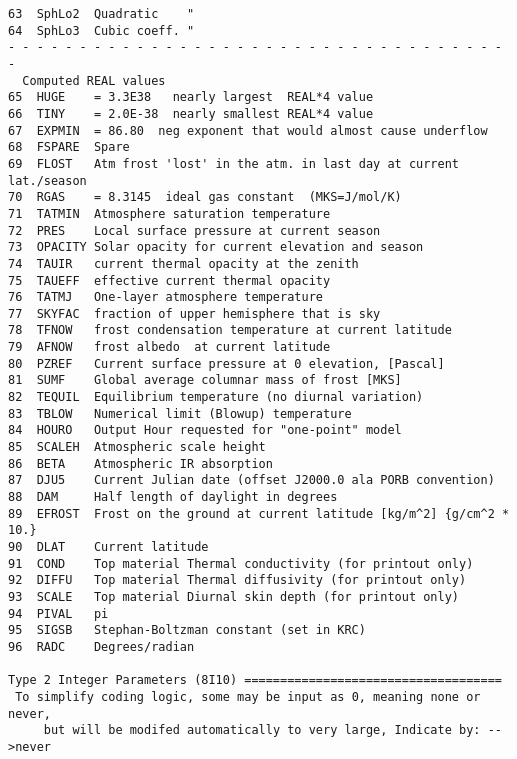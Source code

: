 \documentclass{article}
\begin{document}
\begin{verbatim}
63  SphLo2  Quadratic    "
64  SphLo3  Cubic coeff. "
- - - - - - - - - - - - - - - - - - - - - - - - - - - - - - - - - - - -
  Computed REAL values 
65  HUGE    = 3.3E38   nearly largest  REAL*4 value
66  TINY    = 2.0E-38  nearly smallest REAL*4 value
67  EXPMIN  = 86.80  neg exponent that would almost cause underflow
68  FSPARE  Spare
69  FLOST   Atm frost 'lost' in the atm. in last day at current lat./season
70  RGAS    = 8.3145  ideal gas constant  (MKS=J/mol/K)
71  TATMIN  Atmosphere saturation temperature
72  PRES    Local surface pressure at current season
73  OPACITY Solar opacity for current elevation and season
74  TAUIR   current thermal opacity at the zenith
75  TAUEFF  effective current thermal opacity 
76  TATMJ   One-layer atmosphere temperature
77  SKYFAC  fraction of upper hemisphere that is sky
78  TFNOW   frost condensation temperature at current latitude
79  AFNOW   frost albedo  at current latitude
80  PZREF   Current surface pressure at 0 elevation, [Pascal]
81  SUMF    Global average columnar mass of frost [MKS]
82  TEQUIL  Equilibrium temperature (no diurnal variation)
83  TBLOW   Numerical limit (Blowup) temperature
84  HOURO   Output Hour requested for "one-point" model
85  SCALEH  Atmospheric scale height
86  BETA    Atmospheric IR absorption
87  DJU5    Current Julian date (offset J2000.0 ala PORB convention)
88  DAM     Half length of daylight in degrees
89  EFROST  Frost on the ground at current latitude [kg/m^2] {g/cm^2 * 10.} 
90  DLAT    Current latitude
91  COND    Top material Thermal conductivity (for printout only)
92  DIFFU   Top material Thermal diffusivity (for printout only)
93  SCALE   Top material Diurnal skin depth (for printout only)
94  PIVAL   pi
95  SIGSB   Stephan-Boltzman constant (set in KRC)
96  RADC    Degrees/radian

Type 2 Integer Parameters (8I10) ====================================
 To simplify coding logic, some may be input as 0, meaning none or never,
     but will be modifed automatically to very large, Indicate by: -->never 


\end{verbatim}
\end{document}
